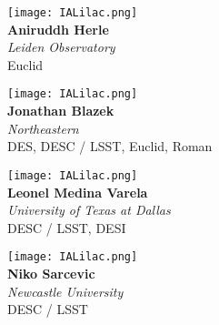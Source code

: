 \documentclass[10pt,letterpaper]{article}
\begin{document}
\begin{multicols}{2}
    \begin{minipage}[t][2in][c]{.45\textwidth}
    \centering
    \texttt{[image: IALilac.png]}\\
    \Huge \textbf{Aniruddh Herle}\\
    \vspace{0.3cm}
    \Large \textit{Leiden Observatory} \\
    \vspace{0.5cm}
    \small Euclid
    \end{minipage}
    \vspace{.5cm}
    
    \begin{minipage}[t][2in][c]{.45\textwidth}
    \centering
    \texttt{[image: IALilac.png]}\\
    \Huge \textbf{Jonathan Blazek}\\
    \vspace{0.3cm}
    \Large \textit{Northeastern} \\
    \vspace{0.5cm}
    \small DES, DESC / LSST, Euclid, Roman
    \end{minipage}
    \vspace{.5cm}
    
    \begin{minipage}[t][2in][c]{.45\textwidth}
    \centering
    \texttt{[image: IALilac.png]}\\
    \huge \textbf{Leonel Medina Varela}\\
    \vspace{0.3cm}
    \Large \textit{University of Texas at Dallas} \\
    \vspace{0.5cm}
    \small DESC / LSST, DESI
    \end{minipage}
    \vspace{.5cm}
    
    \begin{minipage}[t][2in][c]{.45\textwidth}
    \centering
    \texttt{[image: IALilac.png]}\\
    \Huge \textbf{Niko Sarcevic}\\
    \vspace{0.3cm}
    \Large \textit{Newcastle University} \\
    \vspace{0.5cm}
    \small DESC / LSST
    \end{minipage}
    \vspace{.5cm}
    
\end{multicols}
\end{document}

